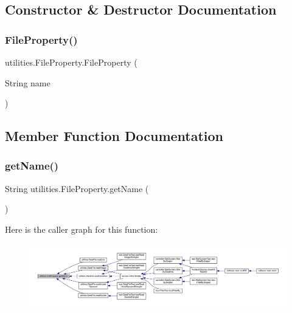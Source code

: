 \subsection{Constructor \& Destructor Documentation}
\mbox{\label{enumutilities_1_1_file_property_ae5d3cd75fb3b377b2e9570490d54f8af}} 
\subsubsection{\texorpdfstring{File\+Property()}{FileProperty()}}
{\footnotesize\ttfamily utilities.\+File\+Property.\+File\+Property (\begin{DoxyParamCaption}\item[{String}]{name }\end{DoxyParamCaption})}



\subsection{Member Function Documentation}
\mbox{\label{enumutilities_1_1_file_property_ab7c90f768108531dd4468878da2f452d}} 
\subsubsection{\texorpdfstring{get\+Name()}{getName()}}
{\footnotesize\ttfamily String utilities.\+File\+Property.\+get\+Name (\begin{DoxyParamCaption}{ }\end{DoxyParamCaption})}

Here is the caller graph for this function\+:\nopagebreak
\begin{figure}[H]
\begin{center}
\leavevmode
\includegraphics[width=350pt]{enumutilities_1_1_file_property_ab7c90f768108531dd4468878da2f452d_icgraph}
\end{center}
\end{figure}


